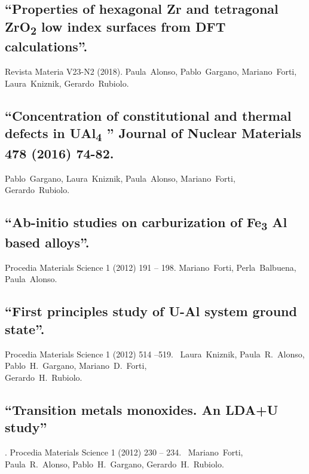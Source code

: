 \subsection{“Properties of hexagonal Zr and tetragonal ZrO\textsubscript{2} low index surfaces from DFT calculations”. }
Revista Materia V23-N2 (2018).
\mbox{Paula Alonso}, \mbox{Pablo Gargano}, \mbox{Mariano Forti}, \mbox{Laura Kniznik}, \mbox{Gerardo Rubiolo}.  


\subsection{“Concentration of constitutional and thermal defects in
UAl\textsubscript{4} ” Journal of Nuclear Materials 478 (2016) 74-82. } 
\mbox{Pablo Gargano}, \mbox{Laura Kniznik}, \mbox{Paula Alonso}, \mbox{Mariano Forti},\\ \mbox{Gerardo Rubiolo}.


\subsection{“Ab-initio studies on carburization of Fe\textsubscript{3} Al based
alloys”. }
Procedia Materials Science 1 (2012) 191 – 198. 
\mbox{Mariano Forti}, \mbox{Perla Balbuena}, \mbox{Paula Alonso}.

 \subsection{“First principles study of U-Al system ground state”. }
 Procedia  Materials Science 1 (2012) 514 –519. 
 \mbox{ Laura Kniznik}, \mbox{Paula R. Alonso}, \mbox{Pablo H. Gargano}, \mbox{Mariano D. Forti},\\  \mbox{Gerardo H. Rubiolo}.

 \subsection{“Transition metals monoxides. An LDA+U study”}. 
 Procedia Materials Science 1 (2012) 230 – 234. 
 \mbox{ Mariano Forti}, \mbox{Paula R. Alonso}, \mbox{Pablo H. Gargano}, \mbox{Gerardo H. Rubiolo}.



